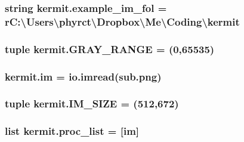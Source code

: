 \subsubsection[{\texorpdfstring{example\+\_\+im\+\_\+fol}{example_im_fol}}]{\setlength{\rightskip}{0pt plus 5cm}string kermit.\+example\+\_\+im\+\_\+fol = r\textquotesingle{}C\+:\textbackslash{}\+Users\textbackslash{}phyrct\textbackslash{}\+Dropbox\textbackslash{}\+Me\textbackslash{}\+Coding\textbackslash{}kermit\textquotesingle{}}\hypertarget{namespacekermit_abbd557f9a28767ae9aca37bb210289f2}{}\label{namespacekermit_abbd557f9a28767ae9aca37bb210289f2}
\subsubsection[{\texorpdfstring{G\+R\+A\+Y\+\_\+\+R\+A\+N\+GE}{GRAY_RANGE}}]{\setlength{\rightskip}{0pt plus 5cm}tuple kermit.\+G\+R\+A\+Y\+\_\+\+R\+A\+N\+GE = (0,65535)}\hypertarget{namespacekermit_a9126e144cfcf0e62c9540ceab41357f6}{}\label{namespacekermit_a9126e144cfcf0e62c9540ceab41357f6}
\subsubsection[{\texorpdfstring{im}{im}}]{\setlength{\rightskip}{0pt plus 5cm}kermit.\+im = io.\+imread(\textquotesingle{}sub.\+png\textquotesingle{})}\hypertarget{namespacekermit_ace003936bdb5e0aba435651a827c4293}{}\label{namespacekermit_ace003936bdb5e0aba435651a827c4293}
\subsubsection[{\texorpdfstring{I\+M\+\_\+\+S\+I\+ZE}{IM_SIZE}}]{\setlength{\rightskip}{0pt plus 5cm}tuple kermit.\+I\+M\+\_\+\+S\+I\+ZE = (512,672)}\hypertarget{namespacekermit_a79b097e6dc51ad46c17adc76d122c74e}{}\label{namespacekermit_a79b097e6dc51ad46c17adc76d122c74e}
\subsubsection[{\texorpdfstring{proc\+\_\+list}{proc_list}}]{\setlength{\rightskip}{0pt plus 5cm}list kermit.\+proc\+\_\+list = \mbox{[}{\bf im}\mbox{]}}\hypertarget{namespacekermit_a8b94ad1d18d6a20c42cad6d65ed1a781}{}\label{namespacekermit_a8b94ad1d18d6a20c42cad6d65ed1a781}
